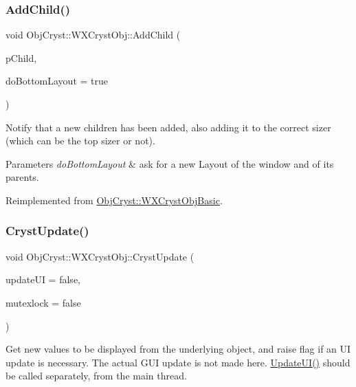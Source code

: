 \subsubsection{\texorpdfstring{AddChild()}{AddChild()}}
{\footnotesize\ttfamily void Obj\+Cryst\+::\+W\+X\+Cryst\+Obj\+::\+Add\+Child (\begin{DoxyParamCaption}\item[{\mbox{\hyperlink{class_obj_cryst_1_1_w_x_cryst_obj_basic}{W\+X\+Cryst\+Obj\+Basic}} $\ast$}]{p\+Child,  }\item[{bool}]{do\+Bottom\+Layout = {\ttfamily true} }\end{DoxyParamCaption})\hspace{0.3cm}{\ttfamily [virtual]}}

Notify that a new children has been added, also adding it to the correct sizer (which can be the top sizer or not).


\begin{DoxyParams}{Parameters}
{\em do\+Bottom\+Layout} & ask for a new Layout of the window and of its parents. \\
\hline
\end{DoxyParams}


Reimplemented from \mbox{\hyperlink{class_obj_cryst_1_1_w_x_cryst_obj_basic_a9f40abffff18b23ca2c616fdb8ad6dd6}{Obj\+Cryst\+::\+W\+X\+Cryst\+Obj\+Basic}}.

\mbox{\label{class_obj_cryst_1_1_w_x_cryst_obj_a1ea28fa0a66b5163b66bf42a8d1451b3}} 
\subsubsection{\texorpdfstring{CrystUpdate()}{CrystUpdate()}}
{\footnotesize\ttfamily void Obj\+Cryst\+::\+W\+X\+Cryst\+Obj\+::\+Cryst\+Update (\begin{DoxyParamCaption}\item[{const bool}]{update\+UI = {\ttfamily false},  }\item[{const bool}]{mutexlock = {\ttfamily false} }\end{DoxyParamCaption})\hspace{0.3cm}{\ttfamily [virtual]}}

Get new values to be displayed from the underlying object, and raise flag if an UI update is necessary. The actual G\+UI update is not made here. \mbox{\hyperlink{class_obj_cryst_1_1_w_x_cryst_obj_a6578681b14426e8a844ac6e4ca7fafea}{Update\+U\+I()}} should be called separately, from the main thread.


